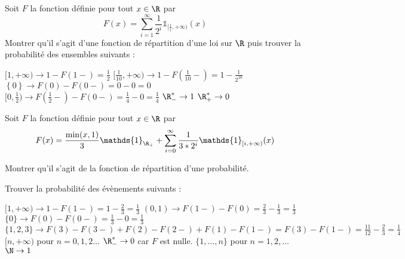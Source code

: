 \documentclass{report}
\begin{document}
\begin{exo}
    Soit \(F\) la fonction définie pour tout \(x\in\R\) par
    \[F(x)=\sum_{i=1}^\infty \frac{1}{2^i}\mathds{1}_{[\frac{1}{i},+\infty)}(x)\]
    Montrer qu'il s'agit d'une fonction de répartition d'une loi sur \(\R\) puis
    trouver la probabilité des ensembles suivants :
    \begin{enumerate}
        \itt \([1,+\infty) \rightarrow 1-F(1-) = \frac12\)
        \itt \([\frac{1}{10},+\infty)\rightarrow 1 - F(\frac{1}{10}-)= 1- \frac{1}{2^{10}}\)
        \itt \(\left\{ 0 \right\}\rightarrow F(0)-F(0-)=0-0=0\)
        \itt \([0,\frac12)\rightarrow F(\frac12-) - F(0-)= \frac14 - 0 = \frac14\)
        \itt \(\R_-^*\rightarrow 1\)
        \itt \(\R_+^*\rightarrow 0\)
    \end{enumerate}
\end{exo}

\begin{exo}
    Soit \(F\) la fonction définie pour tout \(x\in\R\) par
    \[F(x)=\frac{\min(x,1)}{3}\mathds{1}_{\R_+}
    + \sum_{i=0}^\infty \frac{1}{3*2^i}\mathds{1}_{[i,+\infty)}(x)\]
    \begin{q}{1}
        Montrer qu'il s'agit de la fonction de répartition d'une probabilité.
    \end{q}
    \begin{q}{2}
        Trouver la probabilité des évènements suivants :
        \begin{enumerate}
            \itt \([1,+\infty)\rightarrow1-F(1-)=1-\frac23=\frac13\)
            \itt \((0,1)\rightarrow F(1-)-F(0)=\frac23-\frac13=\frac13\)
            \itt \(\{0\}\rightarrow F(0)-F(0-)=\frac13-0=\frac13\)
            \itt \(\{1,2,3\}\rightarrow F(3)-F(3-)+F(2)-F(2-)+F(1)-F(1-)=
            F(3)-F(1-)=\frac{11}{12} - \frac23 =\frac{1}{4}\)
            \itt \([n,+\infty)\) pour \(n=0,1,2\dots\)
            \itt \(\R_-^*\rightarrow 0\) car \(F\) est nulle.
            \itt \(\{1,\dots,n\}\) pour \(n=1,2,\dots\)
            \itt \(\N\rightarrow 1\)
        \end{enumerate}
    \end{q}
\end{exo}
\end{document}
